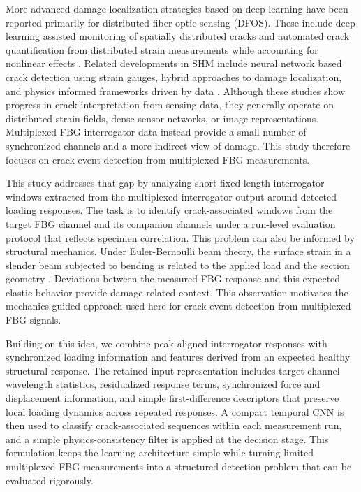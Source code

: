 \documentclass[fleqn,10pt]{wlscirep}
\begin{document}
More advanced damage-localization strategies based on deep learning have been reported primarily for distributed fiber optic sensing (DFOS). These include deep learning assisted monitoring of spatially distributed cracks and automated crack quantification from distributed strain measurements while accounting for nonlinear effects \cite{liu2023,lu2025}. Related developments in SHM include neural network based crack detection using strain gauges, hybrid approaches to damage localization, and physics informed frameworks driven by data \cite{yoon2022,moreh2025,si2025}. Although these studies show progress in crack interpretation from sensing data, they generally operate on distributed strain fields, dense sensor networks, or image representations. Multiplexed FBG interrogator data instead provide a small number of synchronized channels and a more indirect view of damage. This study therefore focuses on crack-event detection from multiplexed FBG measurements.

This study addresses that gap by analyzing short fixed-length interrogator windows extracted from the multiplexed interrogator output around detected loading responses. The task is to identify crack-associated windows from the target FBG channel and its companion channels under a run-level evaluation protocol that reflects specimen correlation. This problem can also be informed by structural mechanics. Under Euler-Bernoulli beam theory, the surface strain in a slender beam subjected to bending is related to the applied load and the section geometry \cite{ochsner2021}. Deviations between the measured FBG response and this expected elastic behavior provide damage-related context. This observation motivates the mechanics-guided approach used here for crack-event detection from multiplexed FBG signals.

Building on this idea, we combine peak-aligned interrogator responses with synchronized loading information and features derived from an expected healthy structural response. The retained input representation includes target-channel wavelength statistics, residualized response terms, synchronized force and displacement information, and simple first-difference descriptors that preserve local loading dynamics across repeated responses. A compact temporal CNN is then used to classify crack-associated sequences within each measurement run, and a simple physics-consistency filter is applied at the decision stage. This formulation keeps the learning architecture simple while turning limited multiplexed FBG measurements into a structured detection problem that can be evaluated rigorously.
\end{document}
